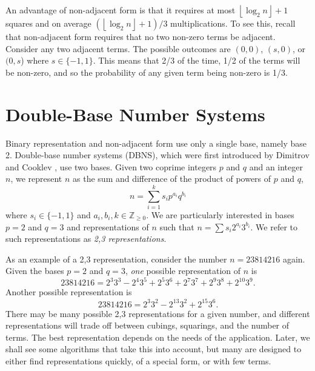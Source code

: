 \documentclass{ucalgthes1}
\theoremstyle{definition}
\newcommand{\ZZgez}{\mathbb{Z}_{\ge 0}}
\newcommand{\floor}[1]{\left\lfloor #1 \right\rfloor}
\begin{document}
An advantage of non-adjacent form is that it requires at most $\floor{\log_2 n}+1$ squares and on average $(\floor{\log_2 n}+1)/3$ multiplications.  To see this, recall that non-adjacent form requires that no two non-zero terms be adjacent.  Consider any two adjacent terms.  The possible outcomes are $(0,0)$, $(s, 0)$, or $(0, s$) where $s \in \{-1, 1\}$. This means that 2/3 of the time, 1/2 of the terms will be non-zero, and so the probability of any given term being non-zero is 1/3.


\bigbreak
\section{Double-Base Number Systems}
\label{sec:dbns}

Binary representation and non-adjacent form use only a single base, namely base 2.  Double-base number systems (DBNS), which were first introduced by Dimitrov and Cooklev \cite{Dimitrov1995a, Dimitrov1995b}, use two bases.  Given two coprime integers $p$ and $q$ and an integer $n$, we represent $n$ as the sum and difference of the product of powers of $p$ and $q$,
\begin{equation}\label{eq:generalDbnsForm}
	n = \sum_{i=1}^k s_i p^{a_i} q^{b_i}
\end{equation}
where $s_i \in \{-1, 1\}$ and $a_i, b_i, k \in \ZZgez$. We are particularly interested in bases $p=2$ and $q=3$ and representations of $n$ such that $n = \sum s_i 2^{a_i} 3^{b_i}$.  We refer to such representations as \emph{2,3 representations}.

As an example of a 2,3 representation, consider the number $n=23814216$ again.  Given the bases $p=2$ and $q=3$, \emph{one} possible representation of $n$ is
\begin{equation}\label{eq:chainedEg1}
	23814216 = 2^3 3^3 - 2^4 3^5 + 2^5 3^6  + 2^7 3^7  + 2^9 3^8 + 2^{10} 3^9.
\end{equation}
Another possible representation is
\begin{equation}\label{eq:chainedEg2}
	23814216 = 2^3 3^2 -2^{13} 3^2 +2^{15} 3^6.
\end{equation}
There may be many possible 2,3 representations for a given number, and different representations will trade off between cubings, squarings, and the number of terms.  The best representation depends on the needs of the application.  Later, we shall see some algorithms that take this into account, but many are designed to either find representations quickly, of a special form, or with few terms.
\end{document}
